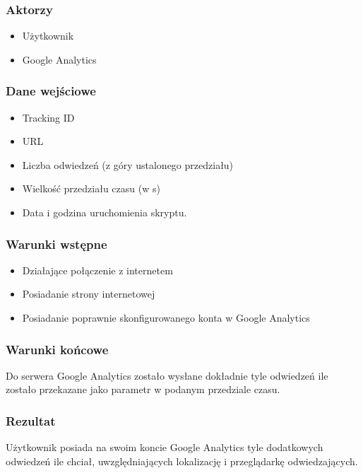 \documentclass{article}
\begin{document}
    \subsubsection{Aktorzy}
    \begin{itemize}
    \item Użytkownik
    \item Google Analytics
    \end{itemize}
    
    \subsubsection{Dane wejściowe}
    \begin{itemize}
    \item Tracking ID
    \item URL
    \item Liczba odwiedzeń (z góry ustalonego przedziału)
    \item Wielkość przedziału czasu (w s)
    \item Data i godzina uruchomienia skryptu.
    \end{itemize}
    
    \subsubsection{Warunki wstępne}
    \begin{itemize}
    \item Działające połączenie z internetem
    \item Posiadanie strony internetowej
    \item Posiadanie poprawnie skonfigurowanego konta w Google Analytics
    \end{itemize}
    
    \subsubsection{Warunki końcowe}
    Do serwera Google Analytics zostało wysłane dokładnie tyle odwiedzeń ile zostało przekazane jako parametr w podanym przedziale czasu.
    
    \subsubsection{Rezultat}
    Użytkownik posiada na swoim koncie Google Analytics tyle dodatkowych odwiedzeń ile chciał, uwzględniających lokalizację i przeglądarkę odwiedzających.
    
\end{document}
